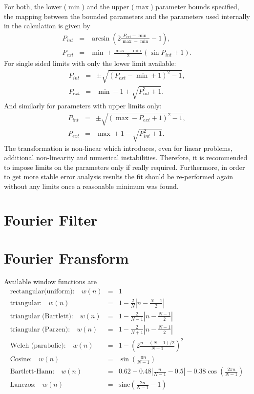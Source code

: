 For both, the lower ($\min$) and the upper ($\max$) parameter bounds specified, the mapping between the bounded parameters and the parameters used internally in the calculation is given by
\begin{eqnarray*}
P_{int} &=& \arcsin \left( 2\frac{P_{ext} - \min}{\max - \min} - 1 \right), \\
P_{ext} &=& \min + \frac{\max - \min}{2} \left( \sin P_{int} + 1 \right).
\end{eqnarray*}
For single sided limits with only the lower limit available:
\begin{eqnarray*}
P_{int} &=& \pm \sqrt{ (P_{ext} - \min + 1)^2 - 1}, \\
P_{ext} &=& \min - 1 + \sqrt{P_{int}^2 + 1}.
\end{eqnarray*}
And similarly for parameters with upper limits only:
\begin{eqnarray*}
P_{int} &=& \pm \sqrt{ (\max - P_{ext} + 1)^2 - 1},\\
P_{ext} &=& \max + 1 - \sqrt{P_{int}^2 + 1}.
\end{eqnarray*}
The transformation is non-linear which introduces, even for linear problems, additional non-linearity and numerical instabilities. Therefore, it is recommended to impose limits on the parameters only if really required. Furthermore, in order to get more stable error analysis results the fit should be re-performed again without any limits once a reasonable minimum was found.

\section{Fourier Filter}\label{sec:fourier_filter}

\newpage
\section{Fourier Fransform}
Available window functions are
\begin{eqnarray*}
\text{rectangular(uniform):} \quad  w(n) &=& 1 \\
\text{triangular:} \quad w(n) &=& 1 - \frac{2}{N} \left| n-\frac{N-1}{2} \right| \\
\text{triangular (Bartlett):} \quad  w(n) &=&  1 - \frac{2}{N-1} \left|n-\frac{N-1}{2}\right| \\
\text{triangular (Parzen):} \quad  w(n) &=& 1 - \frac{2}{N+1} \left| n-\frac{N-1}{2} \right| \\
\text{Welch (parabolic):} \quad  w(n) &=& 1 - \left(2 \frac{n-(N-1)/2}{N+1} \right)^2 \\
\text{Cosine:} \quad  w(n) &=& \sin\left( \frac{\pi n}{N-1} \right) \\
\text{Bartlett-Hann:} \quad  w(n) &=& 0.62 - 0.48 \left| \frac{n}{N-1}-0.5 \right| - 0.38 \cos\left(\frac{2\pi n}{N-1}\right) \\
\text{Lanczos:} \quad  w(n) &=& \mathrm{sinc} \left(\frac{2n}{N-1}-1\right) \\
\end{eqnarray*}


